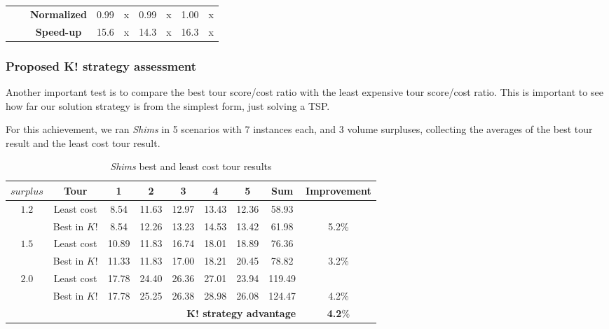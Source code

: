 \documentclass[preprint]{elsarticle}
\begin{document}
\begin{table}[H]
\begin{tabular}{ccc|cc|cc|cc}
		&                                       & {\bf Normalized} & 0.99    & x       & 0.99    & x       & 1.00    & x\\
		&                                       & {\bf Speed-up}   & 15.6    & x       & 14.3    & x       & 16.3    & x\\
			                                        
		\bottomrule
		
	\end{tabular}
	\normalsize
\end{table}


{\color{blue}

\subsubsection{Proposed K! strategy assessment}

Another important test is to compare the best tour score/cost ratio with the least expensive tour score/cost ratio. This is important to see how far our solution strategy is from the simplest form, just solving a TSP.

For this achievement, we ran {\it Shims} in 5 scenarios with 7 instances each, and 3 volume surpluses, collecting the averages of the best tour result and the least cost tour result.

\begin{table}[H]
\centering
\caption{{\it Shims} best and least cost tour results}  \label{tab:20least}
\footnotesize
\begin{tabular}{ccccccccc}
\toprule
{$surplus$}              & {\bf Tour} & {\bf 1} & {\bf 2} & {\bf 3} & {\bf 4}  & {\bf 5}   & {\bf Sum} & {\bf Improvement}\\
\toprule

\multirow{2}{*}{$1.2$}   & Least cost    & 8.54    & 11.63   & 12.97   & 13.43  & 12.36 & 58.93 &       \\ 
                         & Best in $K!$  & 8.54    & 12.26   & 13.23   & 14.53  & 13.42 & 61.98 & 5.2\%  \\ 
\midrule[.1pt]	
\multirow{2}{*}{$1.5$}   & Least cost    & 10.89   & 11.83   & 16.74   & 18.01  & 18.89 & 76.36 & \\ 	
                         & Best in $K!$  & 11.33   & 11.83   & 17.00   & 18.21  & 20.45 & 78.82 &  3.2\%  \\ 
\midrule[.1pt]	
\multirow{2}{*}{$2.0$}   & Least cost    & 17.78   & 24.40   & 26.36   & 27.01  & 23.94 & 119.49 &  \\ 
                         & Best in $K!$  & 17.78   & 25.25   & 26.38   & 28.98  & 26.08 & 124.47 & 4.2\%   \\ 		                         
\midrule[.1pt]
\multicolumn{8}{r}{{\bf K! strategy advantage}}                                              & {\bf 4.2}\% \\


\end{tabular}
\end{table}}
\end{document}
